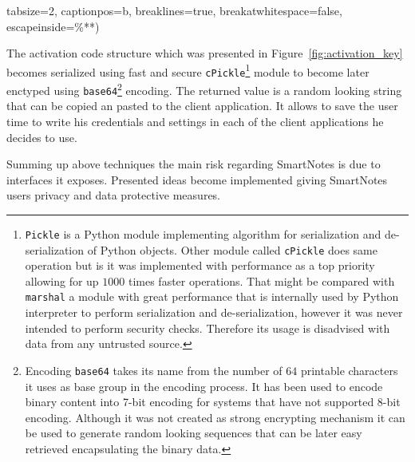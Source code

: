 \begin{itemize}
{{tabsize=2,                    %
captionpos=b,                   %
breaklines=true,                %
breakatwhitespace=false,        %
escapeinside={\%*}{*)}          %
}

The activation code structure which was presented in Figure~\ref{fig:activation_key} becomes serialized using fast and secure \texttt{cPickle}\footnote{\texttt{Pickle} is a Python module implementing algorithm for serialization and de-serialization of Python objects. Other module called \texttt{cPickle} does same operation but is it was implemented with performance as a top priority allowing for up $1000$ times faster operations. That might be compared with \texttt{marshal} a module with great performance that is internally used by Python interpreter to perform serialization and de-serialization, however it was never intended to perform security checks. Therefore its usage is disadvised with data from any untrusted source.} module to become later enctyped using \texttt{base64}\footnote{Encoding \texttt{base64} takes its name from the number of $64$ printable characters it uses as base group in the encoding process. It has been used to encode binary content into 7-bit encoding for systems that have not supported 8-bit encoding. Although it was not created as strong encrypting mechanism it can be used to generate random looking sequences that can be later easy retrieved encapsulating the binary data.} encoding. The returned value is a random looking string that can be copied an pasted to the client application. It allows to save the user time to write his credentials and settings in each of the client applications he decides to use.}
\end{itemize}

Summing up above techniques the main risk regarding SmartNotes is due to interfaces it exposes. Presented ideas become implemented giving SmartNotes users privacy and data protective measures.
